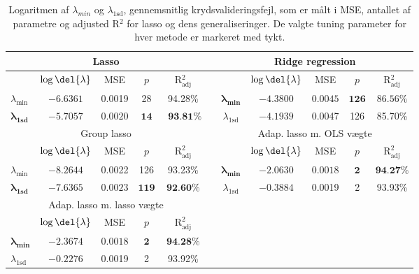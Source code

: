 \begin{table}[ht]
\center
\begin{tabular}{lcccc | lccccc}
\toprule
   \multicolumn{5}{c}{Lasso} & \multicolumn{1}{c}{ }&  \multicolumn{5}{c}{Ridge regression}  \\ \midrule
 & \(\log \del{\lambda}\) & MSE & $p$ & R$^2_{\text{adj}}$ &&& \(\log \del{\lambda}\) & MSE & $p$ & R$^2_{\text{adj}}$\\
 $\lambda_{\min}$ &$-6.6361$& 0.0019 & 28 & 94.28\% &&  $\boldsymbol{\lambda_{\min}}$ &  $\mathbf{-4.3800}$ &   $\mathbf{0.0045} $&  $\mathbf{126}$ & $ \mathbf{86.56 \% }$ \\ 
 $\boldsymbol{\lambda}_{\textbf{1sd}}$ & $\mathbf{-5.7057}$ & $\mathbf{0.0020} $ & $\mathbf{14}$ &$\textbf{ 93.81} \boldsymbol{\%}$ && $\lambda_{ \text{1sd}}$& $-4.1939$ & 0.0047 & 126 &  85.70\%  \\ \bottomrule \toprule
\multicolumn{5}{c}{Group lasso}  &&  \multicolumn{5}{c}{Adap. lasso m. OLS vægte}  \\ \midrule
& \(\log \del{\lambda}\) & MSE &$ p $ &R$^2_{\text{adj}}$&&& \(\log \del{\lambda}\) & MSE & $p$ & R$^2_{\text{adj}}$ \\
$\lambda_{\min}$& $-8.2644$ & 0.0022  & 126 & 93.23\% && $\boldsymbol{\lambda_{\min}}$  & $\mathbf{-2.0630}$ &$ \mathbf{0.0018}$ & $\mathbf{2}$ & $\textbf{94.27} \%$ \\
  $\boldsymbol{\lambda}_{\textbf{1sd}}$  & $\mathbf{-7.6365}$ &$ \mathbf{0.0023}$ & $\mathbf{119}$ &$ \textbf{92.60} \%$ &&  $\lambda_{1\text{sd}}$ & $-0.3884$ & 0.0019 & 2 &  93.93\%\\  \bottomrule 
  \toprule
  \multicolumn{5}{c}{Adap. lasso m. lasso vægte}  \\ \cmidrule{1-5}
& \(\log \del{\lambda}\) & MSE & $p$ & R$^2_{\text{adj}}$\\
$\boldsymbol{\lambda_{\min}}$   &  $ \mathbf{-2.3674}$ & $ \mathbf{0.0018} $& $ \mathbf{2}$ &   $\textbf{94.28} \%$ \\
$\lambda_{1\text{sd}}$  & $-0.2276$ & 0.0019 & 2 & 93.92\%\\ \cmidrule{1-5}
 \end{tabular}
\caption{Logaritmen af $\lambda_{min}$ og $\lambda_{1\text{sd}}$, gennemsnitlig krydsvalideringsfejl, som er målt i MSE, antallet af parametre og adjusted R$^2$ for lasso og dens generaliseringer. De valgte tuning parameter for hver metode er markeret med tykt.} \label{tab:cv_tab}
\end{table}
